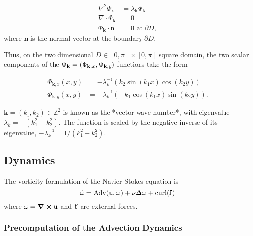\begin{align*}
\nabla^2 \Phi_{\textbf{k}} &= \lambda_{\textbf{k}}\Phi_{\textbf{k}} \\
\nabla \cdot \Phi_{\textbf{k}} &= 0 \\
\Phi_{\textbf{k}} \cdot \textbf{n} &= 0 \text{ at } \partial D,
\end{align*}
where $\textbf{n}$ is the normal vector at the boundary $\partial D$.

Thus, on the two dimensional $D \in [0, \pi] \times [0, \pi]$ square domain, the
two scalar components of the $\Phi_{\vb{k}} =(\Phi_{\vb{k}, x},
\Phi_{\vb{k},y})$ functions take the form 

\begin{align}
\Phi_{\textbf{k},x}(x, y) &= -\lambda_k^{-1} 
    ( k_2 \sin(k_1 x) \cos(k_2 y) ) \\
\Phi_{\textbf{k},y}(x, y) &= -\lambda_k^{-1}
    ( -k_1 \cos(k_1 x) \sin(k_2 y) ).
\end{align}

$\textbf{k} = (k_1, k_2) \in \mathbb{Z}^2$ is known as the *vector wave
number*, with eigenvalue $\lambda_k = -(k_1^2 + k_2^2)$. 
The function is scaled by the negative inverse of its eigenvalue, 
$-\lambda_k^{-1} = 1/(k_1^2 + k_2^2)$.

\subsection*{Dynamics}
The vorticity formulation of the Navier-Stokes equation is
\begin{equation}\label{eq:NSE-vorticity}
    \dot{\bf{\omega}} = \text{Adv}(\bf{u}, \bf{\omega}) + \nu \Delta\bf{\omega}
    + \text{curl}(\bf{f})
\end{equation}
where $\bf{\omega} = \curl{\bf{u}}$ and $\bf{f}$ are external forces.

\subsubsection*{Precomputation of the Advection Dynamics}
\todo{}





















